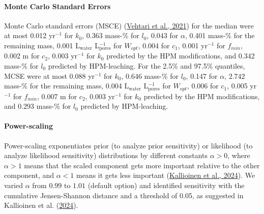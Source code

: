 \documentclass[
  12pt,
]{article}
\begin{document}
\hypertarget{monte-carlo-standard-errors}{%
\paragraph*{Monte Carlo Standard Errors}\label{monte-carlo-standard-errors}}

Monte Carlo standard errors (MSCE) (\protect\hyperlink{ref-Vehtari.2021}{Vehtari et al., 2021}) for the median were at most 0.012 yr\(^{-1}\) for \(k_0\), 0.363 mass-\% for \(l_0\), 0.043 for \(\alpha\), 0.401 mass-\% for the remaining mass, 0.001 L\(_\text{water}\) L\(_\text{pores}^{-1}\) for \(W_{opt}\), 0.004 for \(c_{1}\), 0.001 yr\(^{-1}\) for \(f_{min}\), 0.002 m for \(c_{2}\), 0.003 yr\(^{-1}\) for \(k_0\) predicted by the HPM modifications, and 0.342 mass-\% for \(l_0\) predicted by HPM-leaching. For the 2.5\% and 97.5\% quantiles, MCSE were at most 0.088 yr\(^{-1}\) for \(k_0\), 0.646 mass-\% for \(l_0\), 0.147 for \(\alpha\), 2.742 mass-\% for the remaining mass, 0.004 L\(_\text{water}\) L\(_\text{pores}^{-1}\) for \(W_{opt}\), 0.006 for \(c_{1}\), 0.005 yr\(^{-1}\) for \(f_{min}\), 0.007 m for \(c_{2}\), 0.003 yr\(^{-1}\) for \(k_0\) predicted by the HPM modifications, and 0.293 mass-\% for \(l_0\) predicted by HPM-leaching.

\hypertarget{power-scaling}{%
\paragraph*{Power-scaling}\label{power-scaling}}

Power-scaling exponentiates prior (to analyze prior sensitivity) or likelihood (to analyze likelihood sensitivity) distributions by different constants \(\alpha>0\), where \(\alpha>1\) means that the scaled component gets more important relative to the other component, and \(\alpha<1\) means it gets less important (\protect\hyperlink{ref-Kallioinen.2024}{Kallioinen et al., 2024}). We varied \(\alpha\) from \(0.99\) to \(1.01\) (default option) and identified sensitivity with the cumulative Jensen-Shannon distance and a threshold of 0.05, as suggested in Kallioinen et al. (\protect\hyperlink{ref-Kallioinen.2024}{2024}).
\end{document}
